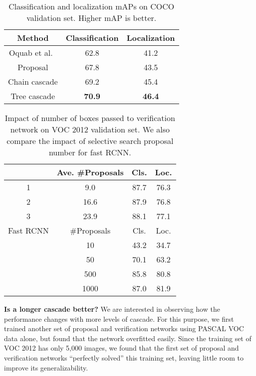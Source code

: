 \documentclass[10pt,twocolumn,letterpaper]{article}
\begin{document}
\begin{table}
\small
\center
\begin{tabular}{ccc}
\hline
Method & Classification & Localization\\
\hline
Oquab et al.~\cite{Oquab_2015_CVPR} & 62.8 & 41.2\\
\rowcolor{gray!30}Proposal & 67.8 & 43.5\\
Chain cascade & 69.2 & 45.4\\
\rowcolor{gray!30}Tree cascade & \textbf{70.9} & \textbf{46.4}\\
\hline
\end{tabular}
\caption{Classification and localization mAPs on COCO validation set. Higher mAP is better.}
\label{tab:coco_result}
\end{table}


\begin{table}
\small
\center
\begin{tabular}{cccc}
\hline
 & Ave. \#Proposals & Cls. & Loc.\\
\hline
\rowcolor{gray!30}1 & 9.0 & 87.7 & 76.3\\
2 & 16.6 & 87.9 & 76.8\\
\rowcolor{gray!30}3 & 23.9 & 88.1 & 77.1\\
\hline
\hline
Fast RCNN & \#Proposals & Cls. & Loc.\\
\hline
\rowcolor{gray!30}&10&43.2&34.7\\
&50&70.1&63.2\\
\rowcolor{gray!30}&500&85.8&80.8\\
&1000&87.0&81.9\\
\hline
\end{tabular}
\caption{Impact of number of boxes passed to verification network on VOC 2012 validation set. We also compare the impact of selective search proposal number for fast RCNN.}
\label{tab:proposal_number}
\end{table}








\textbf{Is a longer cascade better?} We are interested in observing how the performance changes with more levels of cascade. For this purpose, we first trained another set of proposal and verification networks using PASCAL VOC data alone, but found that the network overfitted easily. Since the training set of VOC 2012 has only 5,000 images, we found that the first set of proposal and verification networks ``perfectly solved'' this training set, leaving little room to improve its generalizability.
\end{document}
